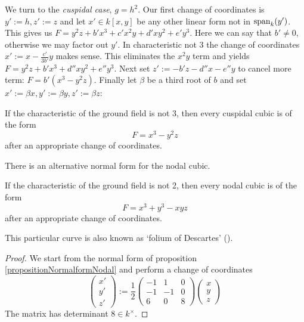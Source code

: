 We turn to the \emph{cuspidal case}, $g = h^2$.
Our first change of coordinates is $y' := h, z' := z$ and let $x' \in k[x,y]$ be any other linear form not in ${\operatorname{span}}_k(y')$.
This gives us $F = y^2z + b'x^3 + c'x^2y + d'xy^2 + e'y^3$.
Here we can say that $b' \neq 0$, otherwise we may factor out $y'$.
In characteristic not 3 the change of coordinates $x' := x - \frac{c'}{3b'}y$ makes sense.
This eliminates the $x^2y$ term and yields $F = y^2z + b'x^3 +  d''xy^2 + e''y^3$.
Next set $z' := -b'z -d''x -e''y$ to cancel more term: $F = b'(x^3 - y^2z)$.
Finally let $\beta$ be a third root of $b$ and set $x' := \beta x, y' := \beta y, z' := \beta z$:
\begin{proposition} \label{propositionNormalformCuspidal}
If the characteristic of the ground field is not 3, then every cuspidal cubic is of the form
\begin{equation}
F = x^3 - y^2z
\end{equation}
after an appropriate change of coordinates.
\end{proposition}

There is an alternative normal form for the nodal cubic.

\begin{proposition} \label{propositionNormalformNodal2}
If the characteristic of the ground field is not 2, then every nodal cubic is of the form
\begin{equation}
F = x^3 + y^3 - xyz
\end{equation}
after an appropriate change of coordinates.
\end{proposition}

\begin{remark}
This particular curve is also known as `folium of Descartes' (\cite[p.88]{brieskorn2012plane}).
\end{remark}

\begin{proof}
We start from the normal form of proposition \ref{propositionNormalformNodal} and perform a change of coordinates
\begin{equation}
\begin{pmatrix} x' \\ y' \\ z' \end{pmatrix}
:=
\frac 12
\begin{pmatrix}
-1 & 1 & 0 \\
-1 & -1 & 0 \\
6 & 0 & 8
\end{pmatrix}
\begin{pmatrix} x \\ y \\ z \end{pmatrix}
\end{equation}
The matrix has determinant $8 \in k^\times$.
\end{proof}
